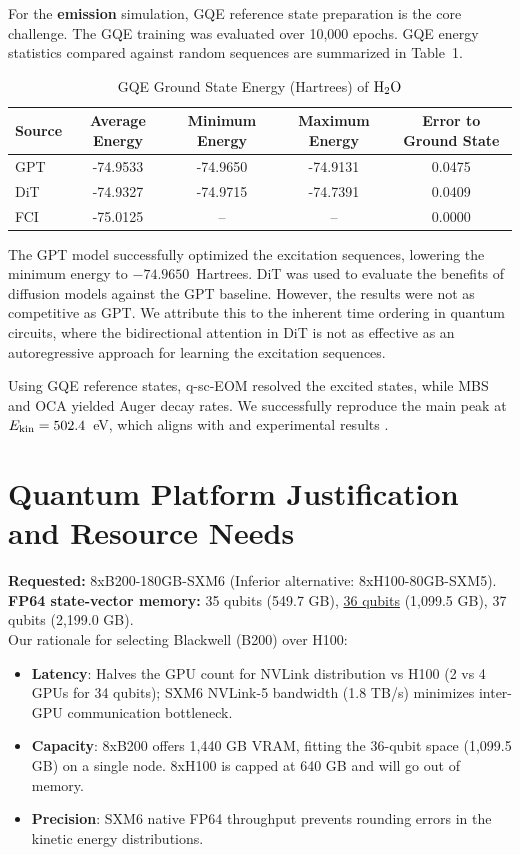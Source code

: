 \documentclass[11pt]{article}
\begin{document}
For the \textbf{emission} simulation, GQE reference state preparation is the core challenge. The GQE training was evaluated over 10,000 epochs. GQE energy statistics compared against random sequences are summarized in Table~1.

\begin{table}[h!]
\centering
\caption{GQE Ground State Energy (Hartrees) of ${\rm H_2O}$}
\vspace{0.5em}
\begin{tabular}{lcccc}
\toprule
\textbf{Source} & \textbf{Average Energy} & \textbf{Minimum Energy} & \textbf{Maximum Energy} & \textbf{Error to Ground State} \\
\midrule
GPT              & -74.9533 & -74.9650 & -74.9131 & 0.0475 \\
DiT              & -74.9327 & -74.9715 & -74.7391 & 0.0409 \\
FCI              & -75.0125 & --       & --       & 0.0000 \\
\bottomrule
\end{tabular}
\end{table}

The GPT model successfully optimized the excitation sequences, lowering the minimum energy to $-74.9650$~Hartrees. DiT was used to evaluate the benefits of diffusion models against the GPT baseline. However, the results were not as competitive as GPT. We attribute this to the inherent time ordering in quantum circuits, where the bidirectional attention in DiT is not as effective as an autoregressive approach for learning the excitation sequences.

Using GQE reference states, q-sc-EOM resolved the excited states, while MBS and OCA yielded Auger decay rates. We successfully reproduce the main peak at $E_{\rm kin} = 502.4$~eV, which aligns with \cite{keithley2026} and experimental results \cite{moddeman1973}.

\section{Quantum Platform Justification and Resource Needs}
\textbf{Requested:} 8xB200-180GB-SXM6 (Inferior alternative: 8xH100-80GB-SXM5).\\
\textbf{FP64 state-vector memory:} 35 qubits (549.7 GB), \underline{36 qubits} (1,099.5 GB), 37 qubits (2,199.0 GB).\\
Our rationale for selecting Blackwell (B200) over H100:
\begin{itemize}[leftmargin=*,noitemsep,topsep=0pt]
  \item \textbf{Latency}: Halves the GPU count for NVLink distribution vs H100 (2 vs 4 GPUs for 34 qubits); SXM6 NVLink-5 bandwidth (1.8 TB/s) minimizes inter-GPU communication bottleneck.
  \item \textbf{Capacity}: 8xB200 offers 1,440 GB VRAM, fitting the 36-qubit space (1,099.5 GB) on a single node. 8xH100 is capped at 640 GB and will go out of memory.
  \item \textbf{Precision}: SXM6 native FP64 throughput prevents rounding errors in the kinetic energy distributions.
\end{itemize}
\end{document}

